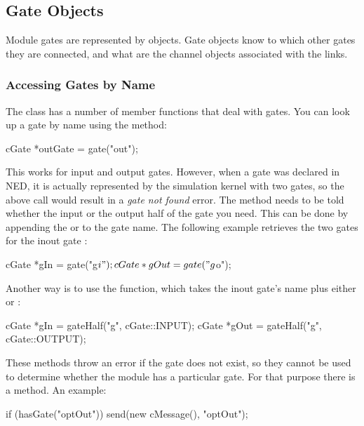 \subsection{Gate Objects}
\label{sec:simple-modules:gate-objects}

Module gates are represented by  objects.
Gate objects know to which other gates they are connected, and
what are the channel objects associated with the links.

\subsubsection{Accessing Gates by Name}
\label{sec:simple-modules:accessing-gates-by-name}

The  class has a number of member functions that
deal with gates. You can look up a gate by name using the 
method:

\begin{cpp}
cGate *outGate = gate("out");
\end{cpp}

This works for input and output gates. However, when a gate was declared
 in NED, it is actually represented by the simulation kernel
with two gates, so the above call would result in a \textit{gate not found}
error. The  method needs to be told whether the input or
the output half of the gate you need. This can be done by appending
the  or  to the gate name. The following example
retrieves the two gates for the inout gate :

\begin{cpp}
cGate *gIn = gate("g$i");
cGate *gOut = gate("g$o");
\end{cpp}

Another way is to use the  function, which takes
the inout gate's name plus either  or :

\begin{cpp}
cGate *gIn = gateHalf("g", cGate::INPUT);
cGate *gOut = gateHalf("g", cGate::OUTPUT);
\end{cpp}

These methods throw an error if the gate does not exist, so they cannot
be used to determine whether the module has a particular gate.
For that purpose there is a  method. An example:

\begin{cpp}
if (hasGate("optOut"))
   send(new cMessage(), "optOut");
\end{cpp}

